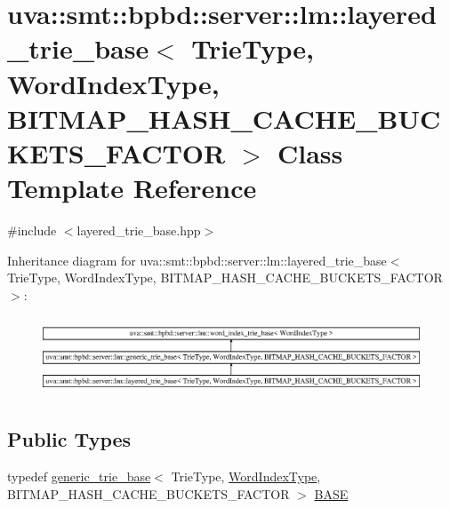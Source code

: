 \hypertarget{classuva_1_1smt_1_1bpbd_1_1server_1_1lm_1_1layered__trie__base}{}\section{uva\+:\+:smt\+:\+:bpbd\+:\+:server\+:\+:lm\+:\+:layered\+\_\+trie\+\_\+base$<$ Trie\+Type, Word\+Index\+Type, B\+I\+T\+M\+A\+P\+\_\+\+H\+A\+S\+H\+\_\+\+C\+A\+C\+H\+E\+\_\+\+B\+U\+C\+K\+E\+T\+S\+\_\+\+F\+A\+C\+T\+O\+R $>$ Class Template Reference}
\label{classuva_1_1smt_1_1bpbd_1_1server_1_1lm_1_1layered__trie__base}


{\ttfamily \#include $<$layered\+\_\+trie\+\_\+base.\+hpp$>$}

Inheritance diagram for uva\+:\+:smt\+:\+:bpbd\+:\+:server\+:\+:lm\+:\+:layered\+\_\+trie\+\_\+base$<$ Trie\+Type, Word\+Index\+Type, B\+I\+T\+M\+A\+P\+\_\+\+H\+A\+S\+H\+\_\+\+C\+A\+C\+H\+E\+\_\+\+B\+U\+C\+K\+E\+T\+S\+\_\+\+F\+A\+C\+T\+O\+R $>$\+:\begin{figure}[H]
\begin{center}
\leavevmode
\includegraphics[height=2.372881cm]{classuva_1_1smt_1_1bpbd_1_1server_1_1lm_1_1layered__trie__base}
\end{center}
\end{figure}
\subsection*{Public Types}
\begin{DoxyCompactItemize}
\item 
typedef \hyperlink{classuva_1_1smt_1_1bpbd_1_1server_1_1lm_1_1generic__trie__base}{generic\+\_\+trie\+\_\+base}$<$ Trie\+Type, \hyperlink{classuva_1_1smt_1_1bpbd_1_1server_1_1lm_1_1word__index__trie__base_a64279b5b94c421b25aedaa72e73d013c}{Word\+Index\+Type}, B\+I\+T\+M\+A\+P\+\_\+\+H\+A\+S\+H\+\_\+\+C\+A\+C\+H\+E\+\_\+\+B\+U\+C\+K\+E\+T\+S\+\_\+\+F\+A\+C\+T\+O\+R $>$ \hyperlink{classuva_1_1smt_1_1bpbd_1_1server_1_1lm_1_1layered__trie__base_a37d97e7da8256c28e8c40f6ecfc5beba}{B\+A\+S\+E}
\end{DoxyCompactItemize}
